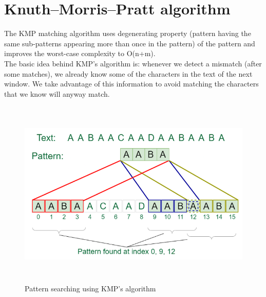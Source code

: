 \documentclass[11pt,a4paper]{article}
\begin{document}
\section{Knuth–Morris–Pratt algorithm}
\label{sec:KMP algorithm}
The KMP matching algorithm uses degenerating property (pattern having the same sub-patterns appearing more than once in the pattern) of the pattern and improves the worst-case complexity to O(n+m).
\\
The basic idea behind KMP’s algorithm is: whenever we detect a mismatch (after some matches), we already know some of the characters in the text of the next window. We take advantage of this information to avoid matching the characters that we know will anyway match. 
\\

\begin{figure}[H]
    \centering
    \includegraphics[width=14cm, height=9cm]{kmp_algorithm.png}
    \caption{Pattern searching using KMP's algorithm}
    \label{fig:StoringExample}
\end{figure}
\end{document}
